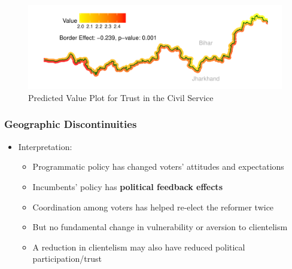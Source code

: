 \documentclass[xcolor=x11names,compress]{beamer}\usepackage[]{graphicx}\usepackage[]{color}
\makeatletter
\def\maxwidth{ %
  \ifdim\Gin@nat@width>\linewidth
    \linewidth
  \else
    \Gin@nat@width
  \fi
}
\renewcommand{\(}{\begin{columns}}
\renewcommand{\)}{\end{columns}}
\newcommand{\<}[1]{\begin{column}{#1}}
\renewcommand{\>}{\end{column}}
\makeatother
\begin{document}
\begin{frame}
\begin{figure}
\includegraphics[width=\maxwidth]{figure/rdd_map_trust_civil_service-1} \caption[Predicted Value Plot for Trust in the Civil Service]{Predicted Value Plot for Trust in the Civil Service}\label{fig:rdd_map_trust_civil_service}
\end{figure}
\end{frame}

\begin{frame}
\frametitle{Geographic Discontinuities}
\begin{itemize}
\item Interpretation:
\begin{itemize}
\item Programmatic policy has changed voters' attitudes and expectations
\pause
\item Incumbents' policy has \textbf{political feedback effects}
\pause
\item Coordination among voters has helped re-elect the reformer twice
\pause
\item But no fundamental change in vulnerability or aversion to clientelism
\pause
\item A reduction in clientelism may also have reduced political participation/trust
\end{itemize}
\end{itemize}
\end{frame}
\end{document}
